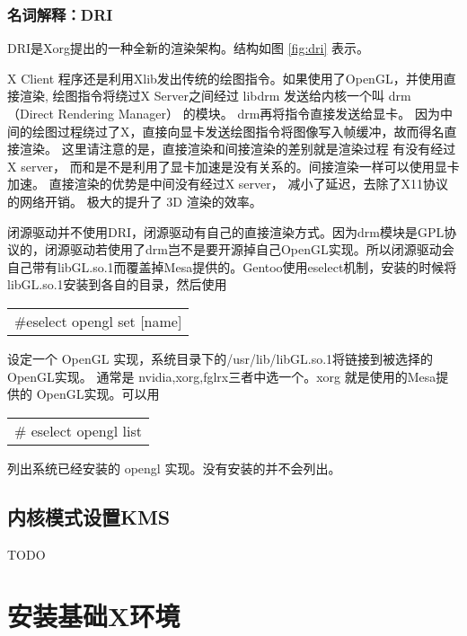 \documentclass[amstex,twoside]{ctexbook}
\newenvironment{insertnote}{ \ttfamily\CJKfamily{KaiTi} }{\vskip 0.5cm }
\newenvironment{code}{\small\tt\begin{longtable}{p{0.8\textwidth}}}{\end{longtable}}
\begin{document}
\begin{insertnote}

\subsubsection{名词解释：DRI}

DRI是Xorg提出的一种全新的渲染架构。结构如图 \ref{fig:dri} 表示。



X Client 程序还是利用Xlib发出传统的绘图指令。如果使用了OpenGL，并使用直接渲染, 绘图指令将绕过X Server之间经过 libdrm 发送给内核一个叫 drm （Direct Rendering Manager） 的模块。
drm再将指令直接发送给显卡。 因为中间的绘图过程绕过了X，直接向显卡发送绘图指令将图像写入帧缓冲，故而得名直接渲染。 这里请注意的是，直接渲染和间接渲染的差别就是渲染过程 有没有经过X server， 而和是不是利用了显卡加速是没有关系的。间接渲染一样可以使用显卡加速。 直接渲染的优势是中间没有经过X server， 减小了延迟，去除了X11协议的网络开销。
极大的提升了 3D 渲染的效率。


闭源驱动并不使用DRI，闭源驱动有自己的直接渲染方式。因为drm模块是GPL协议的，闭源驱动若使用了drm岂不是要开源掉自己OpenGL实现。所以闭源驱动会自己带有libGL.so.1而覆盖掉Mesa提供的。Gentoo使用eselect机制，安装的时候将libGL.so.1安装到各自的目录，然后使用
\begin{code}
\#eselect opengl set [name] 
\end{code}
设定一个 OpenGL 实现，系统目录下的/usr/lib/libGL.so.1将链接到被选择的OpenGL实现。
通常是 nvidia,xorg,fglrx三者中选一个。xorg 就是使用的Mesa提供的 OpenGL实现。可以用
\begin{code}
\# eselect opengl list
\end{code}
 列出系统已经安装的 opengl 实现。没有安装的并不会列出。

\end{insertnote}

\subsection{内核模式设置KMS}

TODO



\section{安装基础X环境}
\end{document}
